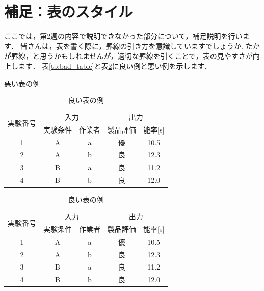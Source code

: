 \documentclass{jarticle}
\begin{document}
\appendix
\section{補足：表のスタイル}
ここでは，第2週の内容で説明できなかった部分について，補足説明を行います．
皆さんは，表を書く際に，罫線の引き方を意識していますでしょうか.
たかが罫線，と思うかもしれませんが，適切な罫線を引くことで，表の見やすさが向上します．
表\ref{tb:bad_table}と表\ref{tb:good_table}に良い例と悪い例を示します．

\begin{table}[H]
  \begin{minipage}[t]{.45\textwidth}
    \caption{悪い表の例}
    \begin{center}
      \begin{tabular}{|c|c|c|c|c|}\hline
        \multirow{2}{*}{実験番号} & \multicolumn{2}{c}{入力} & \multicolumn{2}{c|}{出力}\\ \cline{2-5}
        & 実験条件 & 作業者 & 製品評価 & 能率[s] \\ \hline
        1 & A & a & 優 & 10.5 \\\hline
        2 & A & b & 良 & 12.3 \\\hline
        3 & B & a & 良 & 11.2 \\\hline
        4 & B & b & 良 & 12.0 \\\hline
      \end{tabular}
    \end{center}
    \label{tb:bad_table}
  \end{minipage}
  \hfill
  \begin{minipage}[t]{.45\textwidth}
    \caption{良い表の例}
    \begin{center}
      \begin{tabular}{c|cc|cc}\toprule
        \multirow{2}{*}{実験番号} & \multicolumn{2}{c|}{入力} & \multicolumn{2}{c}{出力}\\
        & 実験条件 & 作業者 & 製品評価 & 能率[s] \\ \hline
        1 & A & a & 優 & 10.5 \\
        2 & A & b & 良 & 12.3 \\
        3 & B & a & 良 & 11.2 \\
        4 & B & b & 良 & 12.0 \\\hline
      \end{tabular}
    \end{center}
    \label{tb:good_table}
  \end{minipage}

\end{table}
\end{document}
